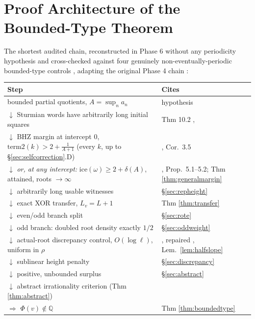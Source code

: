 \documentclass[11pt]{article}
\newcommand{\Q}{\mathbb{Q}}
\begin{document}
\section{Proof Architecture of the Bounded-Type Theorem}
\label{sec:architecture}

The shortest audited chain, reconstructed in Phase 6 without any periodicity hypothesis and cross-checked against four genuinely non-eventually-periodic bounded-type controls \cite{Phase6Arrow}, adapting the original Phase 4 chain \cite{Phase4Chain}:

\begin{center}
\begin{tabular}{ll}
\toprule
Step & Cites \\
\midrule
bounded partial quotients, $A=\sup_n a_n$ & hypothesis \\
$\downarrow$ Sturmian words have arbitrarily long initial squares & Thm 10.2 \cite{DeJesus2026Sturmian}, \cite{ADQZ2001} \\
$\downarrow$ BHZ margin at intercept $0$, $\text{term2}(k)>2+\tfrac1{A+1}$ (every $k$, up to \S\ref{sec:selfcorrection}.D) & \cite{BHZ2006}, Cor.\ 3.5 \\
$\downarrow$ \emph{or, at any intercept:} $\text{ice}(\omega)\ge2+\delta(A)$, attained, roots $\to\infty$ & \cite{BHZ2006}, Prop.\ 5.1--5.2; Thm \ref{thm:generalmargin} \\
$\downarrow$ arbitrarily long usable witnesses & \S\ref{sec:repheight} \\
$\downarrow$ exact XOR transfer, $L_v=L+1$ & Thm \ref{thm:transfer} \cite{Phase2Transfer,Phase5Transfer} \\
$\downarrow$ even/odd branch split & \S\ref{sec:rote} \\
$\downarrow$ odd branch: doubled root density exactly $1/2$ & \S\ref{sec:oddweight} \cite{Phase4Required} \\
$\downarrow$ actual-root discrepancy control, $O(\log\ell)$, uniform in $\rho$ & \cite{Phase2Discrepancy}, repaired \cite{Phase5Hostile}, Lem.\ \ref{lem:halfslope} \\
$\downarrow$ sublinear height penalty & \S\ref{sec:discrepancy} \\
$\downarrow$ positive, unbounded surplus & \S\ref{sec:abstract} \\
$\downarrow$ abstract irrationality criterion (Thm \ref{thm:abstract}) & \cite{Phase2Abstract} \\
$\Rightarrow$ $\Phi(v)\notin\Q$ & Thm \ref{thm:boundedtype} \\
\bottomrule
\end{tabular}
\end{center}
\end{document}
